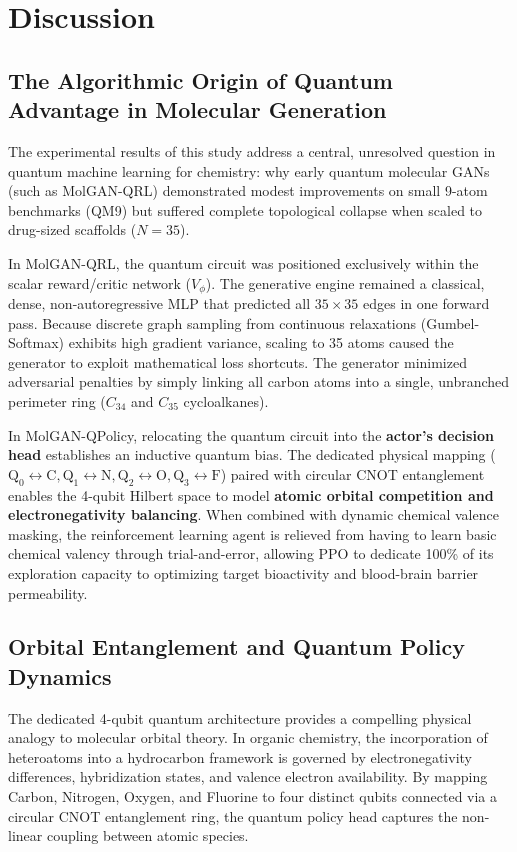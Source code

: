 \documentclass[10pt,a4paper]{article}
\begin{document}
\section{Discussion}

\subsection{The Algorithmic Origin of Quantum Advantage in Molecular Generation}
The experimental results of this study address a central, unresolved question in quantum machine learning for chemistry: why early quantum molecular GANs (such as MolGAN-QRL) demonstrated modest improvements on small 9-atom benchmarks (QM9) but suffered complete topological collapse when scaled to drug-sized scaffolds ($N=35$).

In MolGAN-QRL, the quantum circuit was positioned exclusively within the scalar reward/critic network ($V_\phi$). The generative engine remained a classical, dense, non-autoregressive MLP that predicted all $35 \times 35$ edges in one forward pass. Because discrete graph sampling from continuous relaxations (Gumbel-Softmax) exhibits high gradient variance, scaling to 35 atoms caused the generator to exploit mathematical loss shortcuts. The generator minimized adversarial penalties by simply linking all carbon atoms into a single, unbranched perimeter ring ($C_{34}$ and $C_{35}$ cycloalkanes).

In MolGAN-QPolicy, relocating the quantum circuit into the \textbf{actor's decision head} establishes an inductive quantum bias. The dedicated physical mapping ($\text{Q}_0 \leftrightarrow \text{C}, \text{Q}_1 \leftrightarrow \text{N}, \text{Q}_2 \leftrightarrow \text{O}, \text{Q}_3 \leftrightarrow \text{F}$) paired with circular CNOT entanglement enables the 4-qubit Hilbert space to model \textbf{atomic orbital competition and electronegativity balancing}. When combined with dynamic chemical valence masking, the reinforcement learning agent is relieved from having to learn basic chemical valency through trial-and-error, allowing PPO to dedicate 100\% of its exploration capacity to optimizing target bioactivity and blood-brain barrier permeability.

\subsection{Orbital Entanglement and Quantum Policy Dynamics}
The dedicated 4-qubit quantum architecture provides a compelling physical analogy to molecular orbital theory. In organic chemistry, the incorporation of heteroatoms into a hydrocarbon framework is governed by electronegativity differences, hybridization states, and valence electron availability. By mapping Carbon, Nitrogen, Oxygen, and Fluorine to four distinct qubits connected via a circular CNOT entanglement ring, the quantum policy head captures the non-linear coupling between atomic species. 
\end{document}
